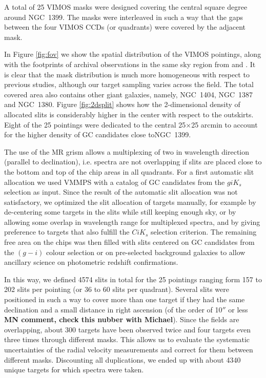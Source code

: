 \documentclass[useAMS,usenatbib]{mn2e}
\begin{document}
A total of 25 VIMOS masks were designed covering the central square degree around NGC~1399. The masks were interleaved in such a way that the gaps between the four VIMOS CCDs (or quadrants) were covered by the adjacent mask. 

In Figure \ref{fig:fov} we show the spatial distribution of the VIMOS pointings, along with the footprints of archival observations in the same sky region from \citet{Schuberth} and \citet{Bergond07}. It is clear that the mask distribution is much more homogeneous with respect to previous studies, although our target sampling varies across the field. The total covered area also contains other giant galaxies, namely, NGC~1404, NGC~1387 and NGC~1380.  
Figure \ref{fig:2dsplit} shows how the 2-dimensional density of allocated slits is considerably higher in the center with respect to the outskirts. Eight of the 25 pointings were dedicated to the central 25$\times$25 arcmin to account for the higher density of GC candidates close toNGC~1399. 

The use of the MR grism allows a multiplexing of two in wavelength direction (parallel to declination), i.e. spectra are not overlapping if slits are placed close to the bottom and top of the chip areas in all quadrants. 
For a first automatic slit allocation we used VMMPS with a catalog of GC candidates from the $giK_s$ selection as input. Since the result of the automatic slit allocation was not satisfactory, we optimized the slit allocation of targets manually, for example by de-centering some targets in the slits while still keeping enough sky, or by allowing some overlap in wavelength range for multiplexed spectra, and by giving preference to targets that also fulfill the $CiK_s$ selection criterion. The remaining free area on the chips was then filled with slits centered on GC candidates from the $(g-i)$ colour selection or on pre-selected background galaxies to allow ancillary science on photometric redshift confirmations.

In this way, we defined 4574 slits in total for the 25 pointings ranging form 157 to 202 slits per pointing (or 36 to 60 slits per quadrant). Several slits were positioned in such a way to cover more than one target if they had the same declination and a small distance in right ascension (of the order of 10$''$ or less {\bf MN comment, check this nubber with Michael}). Since the fields are overlapping, about 300 targets have been observed twice and four targets even three times through different masks. This allows us to evaluate the systematic uncertainties of the radial velocity measurements and correct for them between different masks. Discounting all duplications, we ended up with about 4340 unique targets
for which spectra were taken. 
\end{document}
